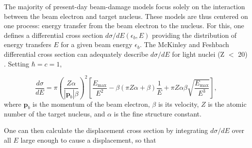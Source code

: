 \documentclass{article}
\begin{document}
The majority of present-day beam-damage models focus solely on the interaction
between the beam electron and target nucleus.
These models are thus centered on one process: energy transfer from the beam
electron to the nucleus.
For this, one defines a differential cross section $d\sigma/dE(\epsilon_b, E)$
providing the distribution of energy transfers $E$ for a given beam energy
$\epsilon_b$.
The McKinley and Feshbach differential cross section can adequately describe
$d\sigma/dE$
for light nuclei (Z $<$ 20) \cite{Mott1929, McKinley1948, Oen1973,
Egerton2010}.  Setting $\hbar = c = 1$,

\begin{equation}
  \frac{d\sigma}{dE}
  =
  \pi\left(\frac{Z\alpha}{|\mathbf{p}_b|\beta}\right)^2
  \left[
    \frac{E_\text{max}}{E^2}
    - \beta(\pi Z\alpha+\beta)\frac{1}{E}
    + \pi Z\alpha\beta\sqrt{\frac{E_\text{max}}{E^3}}
  \right],
  \label{eq:MF}
\end{equation}
%
where $\mathbf{p}_b$ is the momentum of the beam electron, $\beta$ is its
velocity, $Z$ is the atomic number of the target nucleus, and $\alpha$ is the
fine structure constant.

One can then calculate the displacement cross section by integrating
$d\sigma/dE$ over all $E$ large enough to cause a displacement, so that
\end{document}
